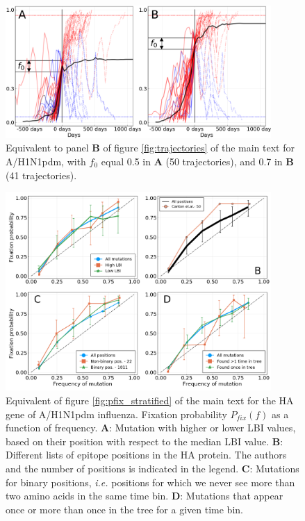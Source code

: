 \documentclass[reprint,amsmath,amssymb,superscriptaddress,showpacs,rmp]{revtex4-1}
\begin{document}
	\begin{figure}
		\centering
		\includegraphics[width=0.9\textwidth]{./SM_figures/ShortTerm_h1n1_varf0.png}
		\caption{Equivalent to panel \textbf{B} of figure \ref{fig:trajectories} of the main text for A/H1N1pdm, with $f_0$ equal 0.5 in \textbf{A} (50 trajectories), and  0.7 in \textbf{B} (41 trajectories).}
		\label{fig:trajectories_h1n1_varf0}
	\end{figure}


	\begin{figure}
		\centering
		\includegraphics[width=0.9\textwidth]{./SM_figures/pfix_v_freq_strat_h1n1pdm.png}
		\caption{Equivalent of figure \ref{fig:pfix_stratified} of the main text for the HA gene of A/H1N1pdm influenza. Fixation probability $P_{fix}(f)$ as a function of frequency. \textbf{A}: Mutation with higher or lower LBI values, based on their position with respect to the median LBI value. \textbf{B}: Different lists of epitope positions in the HA protein. The authors and the number of positions is indicated in the legend. \textbf{C}: Mutations for binary positions, \emph{i.e.} positions for which we never see more than two amino acids in the same time bin. \textbf{D}: Mutations that appear once or more than once in the tree for a given time bin.}
		\label{fig:pfix_stratified_h1n1}
	\end{figure}
\end{document}
